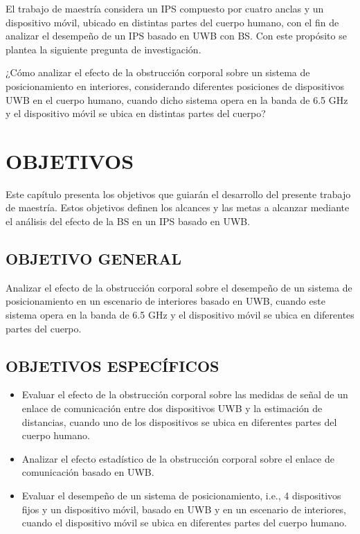 El trabajo de maestría considera un IPS compuesto por cuatro anclas y un dispositivo móvil, ubicado en distintas partes del cuerpo humano, con el fin de analizar el desempeño de un IPS basado en UWB con BS. Con este propósito se plantea la siguiente pregunta de investigación.

¿Cómo analizar el efecto de la obstrucción corporal sobre un sistema de posicionamiento en interiores, considerando diferentes posiciones de dispositivos UWB en el cuerpo humano, cuando dicho sistema opera en la banda de 6.5 GHz y el dispositivo móvil se ubica en distintas partes del cuerpo?


\section{OBJETIVOS}

Este capítulo presenta los objetivos que guiarán el desarrollo del presente trabajo de maestría. Estos objetivos definen los alcances y las metas a alcanzar mediante el análisis del efecto de la BS en un IPS basado en UWB.

\subsection{OBJETIVO GENERAL}

Analizar el efecto de la obstrucción corporal sobre el desempeño de un sistema de posicionamiento en un escenario de interiores basado en UWB, cuando este sistema opera en la banda de 6.5 GHz y el dispositivo móvil se ubica en diferentes partes del cuerpo.

\subsection{OBJETIVOS ESPECÍFICOS}
\begin{itemize}
    \item Evaluar el efecto de la obstrucción corporal sobre las medidas de señal de un enlace de comunicación entre dos dispositivos UWB y la estimación de distancias, cuando uno de los dispositivos se ubica en diferentes partes del cuerpo humano.
    \item Analizar el efecto estadístico de la obstrucción corporal sobre el enlace de comunicación basado en UWB.
    \item Evaluar el desempeño de un sistema de posicionamiento, i.e., 4 dispositivos fijos y un dispositivo móvil, basado en UWB y en un escenario de interiores, cuando el dispositivo móvil se ubica en diferentes partes del cuerpo humano.
\end{itemize}




